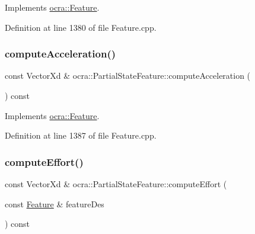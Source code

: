 Implements \hyperlink{classocra_1_1Feature_a4a5973d27459d2dececec8dc73038df8}{ocra\+::\+Feature}.



Definition at line 1380 of file Feature.\+cpp.

\hypertarget{classocra_1_1PartialStateFeature_a7ed5a87165deed25a91f073e348c53a3}{}\label{classocra_1_1PartialStateFeature_a7ed5a87165deed25a91f073e348c53a3} 
\subsubsection{\texorpdfstring{compute\+Acceleration()}{computeAcceleration()}\hspace{0.1cm}{\footnotesize\ttfamily [2/2]}}
{\footnotesize\ttfamily const Vector\+Xd \& ocra\+::\+Partial\+State\+Feature\+::compute\+Acceleration (\begin{DoxyParamCaption}{ }\end{DoxyParamCaption}) const\hspace{0.3cm}{\ttfamily [virtual]}}



Implements \hyperlink{classocra_1_1Feature_aa42b61d4255116caa92042d01ca36b79}{ocra\+::\+Feature}.



Definition at line 1387 of file Feature.\+cpp.

\hypertarget{classocra_1_1PartialStateFeature_a96de4c58baceb9430a1845c4db6ecdfc}{}\label{classocra_1_1PartialStateFeature_a96de4c58baceb9430a1845c4db6ecdfc} 
\subsubsection{\texorpdfstring{compute\+Effort()}{computeEffort()}\hspace{0.1cm}{\footnotesize\ttfamily [1/2]}}
{\footnotesize\ttfamily const Vector\+Xd \& ocra\+::\+Partial\+State\+Feature\+::compute\+Effort (\begin{DoxyParamCaption}\item[{const \hyperlink{classocra_1_1Feature}{Feature} \&}]{feature\+Des }\end{DoxyParamCaption}) const\hspace{0.3cm}{\ttfamily [virtual]}}



